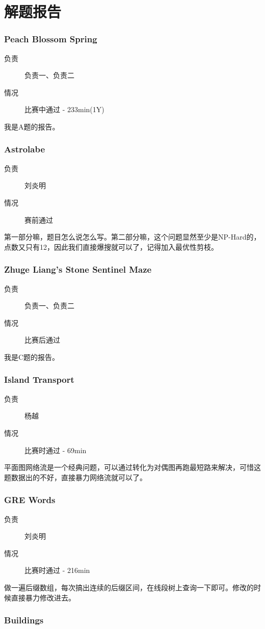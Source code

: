 \documentclass[a4paper, 11pt, nofonts, nocap, fancyhdr]{ctexart}
\newcommand{\problem}[1]{\subsubsection{#1}}
\begin{document}
\section{解题报告}


\problem{Peach Blossom Spring}

\begin{description}
\item[负责] 负责一、负责二
\item[情况] 比赛中通过 - 233min(1Y)
\end{description}

我是A题的报告。

\problem{Astrolabe}

\begin{description}
\item[负责] 刘炎明
\item[情况] 赛前通过
\end{description}

第一部分嘛，题目怎么说怎么写。第二部分嘛，这个问题显然至少是NP-Hard的，点数又只有12，因此我们直接爆搜就可以了，记得加入最优性剪枝。

\problem{Zhuge Liang's Stone Sentinel Maze}

\begin{description}
\item[负责] 负责一、负责二
\item[情况] 比赛后通过
\end{description}

我是C题的报告。

\problem{Island Transport}

\begin{description}
\item[负责] 杨越
\item[情况] 比赛时通过 - 69min
\end{description}

平面图网络流是一个经典问题，可以通过转化为对偶图再跑最短路来解决，可惜这题数据出的不好，直接暴力网络流就可以了。

\problem{GRE Words}

\begin{description}
\item[负责] 刘炎明
\item[情况] 比赛时通过 - 216min
\end{description}

做一遍后缀数组，每次搞出连续的后缀区间，在线段树上查询一下即可。修改的时候直接暴力修改进去。

\problem{Buildings}
\end{document}
